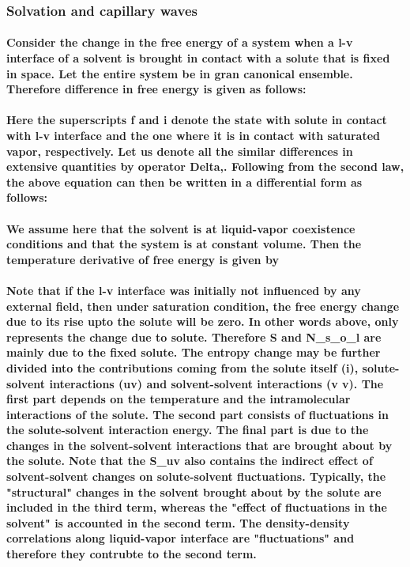 \documentclass[a4paper,12pt,single,pdftex]{scrartcl}
\begin{document}
{\label{ID_19652608}\subsubsection{Solvation and capillary waves}

\label{ID_106467715}\paragraph{Consider the change in the free energy of a system when a l-v interface of a solvent is brought in contact with a solute that is fixed in space. Let the entire system be in gran canonical ensemble. Therefore difference in free energy is given as follows:}

\label{ID_1903608681}\paragraph{Here the superscripts f and i denote the state with solute in contact with l-v interface and the one where it is in contact with saturated vapor, respectively. Let us denote all the similar differences in extensive quantities by operator Delta,. Following from the second law, the above equation can then be written in a differential form as follows:}

\label{ID_1377597507}\paragraph{We assume here that the solvent is at liquid-vapor coexistence conditions and that the system is at constant volume. Then the temperature derivative of free energy is given by}

\label{ID_863437212}\paragraph{Note that if the l-v interface was initially not influenced by any external field, then under saturation condition, the free energy change due to its rise upto the solute will be zero. In other words \Delta \mu above, only represents the change due to solute. Therefore \Delta S and \Delta N_s_o_l are mainly due to the fixed solute. The entropy change may be further divided into the contributions coming from the solute itself (i), solute-solvent interactions (uv) and solvent-solvent interactions (v v). The first part depends on the temperature and the intramolecular interactions of the solute. The second part consists of fluctuations in the solute-solvent interaction energy. The final part is due to the changes in the solvent-solvent interactions that are brought about by the solute. Note that the \Delta S_{uv} also contains the indirect effect of solvent-solvent changes on solute-solvent fluctuations. Typically, the "structural" changes in the solvent brought about by the solute are included in the third term, whereas the "effect of fluctuations in the solvent" is accounted in the second term. The density-density correlations along liquid-vapor interface are "fluctuations" and therefore they contrubte to the second term.}

}
\end{document}
